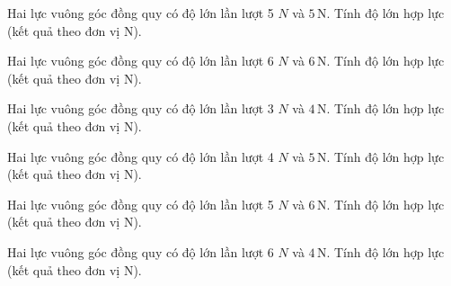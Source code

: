 \begin{ex}
Hai lực vuông góc đồng quy có độ lớn lần lượt 5 $N$ và $5\,\text{N}$. Tính độ lớn hợp lực (kết quả theo đơn vị N).
\end{ex}

\begin{ex}
Hai lực vuông góc đồng quy có độ lớn lần lượt 6 $N$ và $6\,\text{N}$. Tính độ lớn hợp lực (kết quả theo đơn vị N).
\end{ex}

\begin{ex}
Hai lực vuông góc đồng quy có độ lớn lần lượt 3 $N$ và $4\,\text{N}$. Tính độ lớn hợp lực (kết quả theo đơn vị N).
\end{ex}

\begin{ex}
Hai lực vuông góc đồng quy có độ lớn lần lượt 4 $N$ và $5\,\text{N}$. Tính độ lớn hợp lực (kết quả theo đơn vị N).
\end{ex}

\begin{ex}
Hai lực vuông góc đồng quy có độ lớn lần lượt 5 $N$ và $6\,\text{N}$. Tính độ lớn hợp lực (kết quả theo đơn vị N).
\end{ex}

\begin{bt}
Hai lực vuông góc đồng quy có độ lớn lần lượt 6 $N$ và $4\,\text{N}$. Tính độ lớn hợp lực (kết quả theo đơn vị N).
\end{bt}

